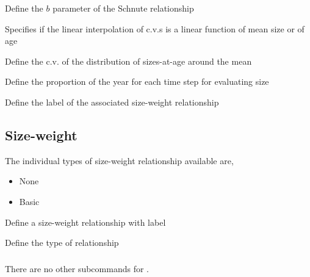  {Define the $b$ parameter of the Schnute relationship}

 {Specifies if the linear interpolation of c.v.s is a linear function of mean size or of age}

 {Define the c.v. of the distribution of sizes-at-age around the mean}

 {Define the proportion of the year for each time step for evaluating size}

 {Define the label of the associated size-weight relationship}

\subsection{Size-weight}

The individual types of size-weight relationship available are, 

\begin{itemize}
	\item None
	\item Basic
\end{itemize}

 {Define a size-weight relationship with label}

 {Define the type of relationship}

\subsubsection[None]{}

There are no other subcommands for .

\subsubsection[Basic]{}

